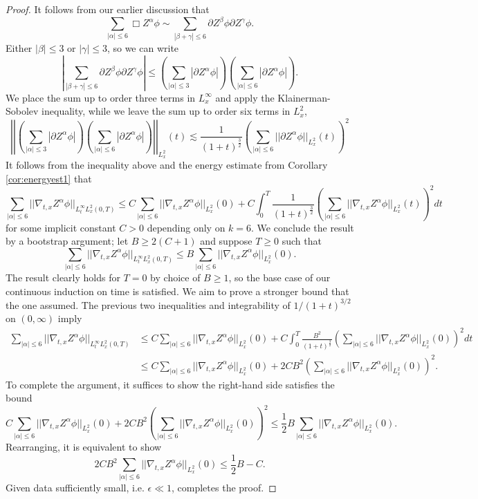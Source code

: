 \begin{proof}
	It follows from our earlier discussion that
		\[ \sum_{|\alpha| \leq 6} \Box Z^\alpha \phi \sim \sum_{|\beta + \gamma| \leq 6} \partial Z^{\beta} \phi \partial Z^{\gamma} \phi  .\]
	Either $|\beta| \leq 3$ or $|\gamma| \leq 3$, so we can write
		\[ \left| \sum_{|\beta + \gamma| \leq 6} \partial Z^{\beta} \phi \partial Z^{\gamma} \phi  \right| \leq \left( \sum_{|\alpha| \leq 3} |\partial Z^\alpha \phi| \right)\left( \sum_{|\alpha| \leq 6} |\partial Z^\alpha \phi| \right).\]
	We place the sum up to order three terms in $L^\infty_x$ and apply the Klainerman-Sobolev inequality, while we leave the sum up to order six terms in $L^2_x$,
		\[ \left| \left| \left( \sum_{|\alpha| \leq 3} |\partial Z^\alpha \phi| \right)\left( \sum_{|\alpha| \leq 6} |\partial Z^\alpha \phi| \right) \right|\right|_{L^2_x} (t) \lesssim \frac{1}{(1 + t)^\frac32} \left( \sum_{|\alpha| \leq 6} ||\partial Z^{\alpha} \phi ||_{L^2_x} (t) \right)^2 \]
	It follows from the inequality above and the energy estimate from Corollary \ref{cor:energyest1} that
		\[ \sum_{|\alpha| \leq 6} ||\nabla_{t, x} Z^\alpha \phi||_{L^\infty_t L^2_x (0, T)} \leq C \sum_{|\alpha| \leq 6} ||\nabla_{t, x} Z^\alpha \phi||_{L^2_x} (0) + C \int_0^T \frac{1}{(1 + t)^\frac32} \left( \sum_{|\alpha| \leq 6} ||\nabla_{t, x} Z^\alpha \phi||_{L^2_x} (t)\right)^2 dt \]
	for some implicit constant $C> 0$ depending only on $k = 6$. We conclude the result by a bootstrap argument; let $B \geq 2(C + 1)$ and suppose $T \geq 0$ such that
		\[ \sum_{|\alpha| \leq 6} ||\nabla_{t, x} Z^\alpha \phi||_{L^\infty_t L^2_x (0, T)} \leq B \sum_{|\alpha| \leq 6} ||\nabla_{t, x} Z^\alpha \phi||_{L^2_x} (0). \]
	The result clearly holds for $T = 0$ by choice of $B \geq 1$, so the base case of our continuous induction on time is satisfied. We aim to prove a stronger bound that the one assumed. The previous two inequalities and integrability of $1/(1 + t)^{3/2}$ on $(0, \infty)$ imply 
		\begin{align*}
			\sum_{|\alpha| \leq 6} ||\nabla_{t, x} Z^{\alpha} \phi||_{L^\infty_t L^2_x (0, T)} 
				& \leq C \sum_{|\alpha| \leq 6} ||\nabla_{t, x} Z^\alpha \phi||_{L^2_x} (0) + C \int_0^T \frac{B^2}{(1 + t)^\frac32} \left( \sum_{|\alpha| \leq 6} ||\nabla_{t, x} Z^\alpha \phi||_{L^2_x} (0)\right)^2 dt \\
				&\leq C \sum_{|\alpha| \leq 6} ||\nabla_{t, x} Z^\alpha \phi||_{L^2_x} (0) + 2CB^2 \left(\sum_{|\alpha| \leq 6} ||\nabla_{t, x} Z^\alpha \phi||_{L^2_x} (0)\right)^2.
		\end{align*}
	To complete the argument, it suffices to show the right-hand side satisfies the bound
		\[ C \sum_{|\alpha| \leq 6} ||\nabla_{t, x} Z^\alpha \phi||_{L^2_x} (0) + 2CB^2 \left(\sum_{|\alpha| \leq 6} ||\nabla_{t, x} Z^\alpha \phi||_{L^2_x} (0)\right)^2 \leq \frac12  B \sum_{|\alpha| \leq 6} ||\nabla_{t, x} Z^\alpha \phi||_{L^2_x} (0).  \]
	Rearranging, it is equivalent to show	
		\[  2CB^2 \sum_{|\alpha| \leq 6} ||\nabla_{t, x} Z^\alpha \phi||_{L^2_x} (0)\leq \frac12 B - C. \]
	Given data sufficiently small, i.e. $\epsilon \ll 1$, completes the proof.  			
\end{proof}


